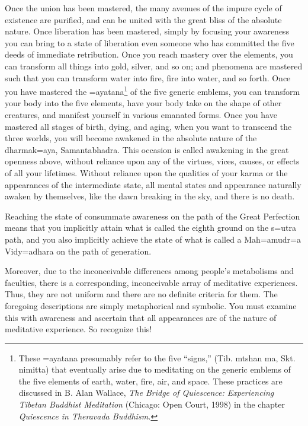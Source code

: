 \documentclass[11pt,twocolumn]{article}
\begin{document}
Once the union has been mastered, the many avenues of the impure cycle
of existence are purified, and can be united with the great bliss of
the absolute nature. Once liberation has been mastered, simply by
focusing your awareness you can bring to a state of liberation even
someone who has committed the five deeds of immediate
retribution. Once you reach mastery over the elements, you can
transform all things into gold, silver, and so on; and phenomena are
mastered such that you can transform water into fire, fire into water,
and so forth. Once you have mastered the \a={a}yatana\footnote{These
  \a={a}yatana presumably refer to the five ``signs,'' (Tib. mtshan
  ma, Skt. nimitta) that eventually arise due to meditating on the
  generic emblems of the five elements of earth, water, fire, air, and
  space. These practices are discussed in B. Alan Wallace, \emph{The
    Bridge of Quiescence: Experiencing Tibetan Buddhist Meditation}
  (Chicago: Open Court, 1998) in the chapter \emph{Quiescence in
    Theravada Buddhism.}} of the five generic emblems, you can
transform your body into the five elements, have your body take on the
shape of other creatures, and manifest yourself in various emanated
forms. Once you have mastered all stages of birth, dying, and aging,
when you want to transcend the three worlds, you will become awakened
in the absolute nature of the dharmak\a={a}ya, Samantabhadra. This
occasion is called awakening in the great openness above, without
reliance upon any of the virtues, vices, causes, or effects of all
your lifetimes. Without reliance upon the qualities of your karma or
the appearances of the intermediate state, all mental states and
appearance naturally awaken by themselves, like the dawn breaking in
the sky, and there is no death.

Reaching the state of consummate awareness on the path of the Great
Perfection means that you implicitly attain what is called the eighth
ground on the s\a={u}tra path, and you also implicitly achieve the
state of what is called a Mah\a={a}mudr\a={a} Vidy\a={a}dhara on the
path of generation.

Moreover, due to the inconceivable differences among people's
metabolisms and faculties, there is a corresponding, inconceivable
array of meditative experiences. Thus, they are not uniform and there
are no definite criteria for them. The foregoing descriptions are
simply metaphorical and symbolic. You must examine this with awareness
and ascertain that all appearances are of the nature of meditative
experience. So recognize this!
\end{document}
